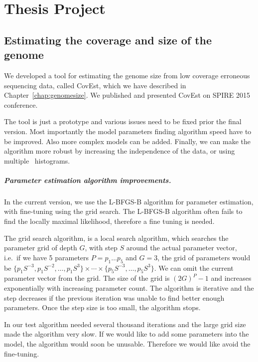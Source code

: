 \chapter{Thesis Project}


\section{Estimating the coverage and size of the genome}

We developed a tool for estimating the genome size from low coverage erroneous sequencing data, called CovEst, which we have described in Chapter~\ref{chap:genomesize}. We published and presented CovEst on SPIRE 2015 conference\cite{covest}.

The tool is just a prototype and various issues need to be fixed prior the final version. Most importantly the model parameters finding algorithm speed have to be improved. Also more complex models can be added. Finally, we can make the algorithm more robust by increasing the independence of the data, or using multiple \kmer\ histograms.

\paragraph{Parameter estimation algorithm improvements.}
In the current version, we use the L-BFGS-B\cite{l-bfgs-b} algorithm for parameter estimation, with fine-tuning using the grid search.
The L-BFGS-B algorithm often fails to find the locally maximal likelihood, therefore a fine tuning is needed.

The grid search algorithm, is a local search algorithm, which searches the parameter grid of depth $G$, with step $S$ around the actual parameter vector, i.e.\ if we have 5 parameters $P = p_1\dots p_5$ and $G = 3$, the grid of parameters would be $\{p_1 S^{-3}, p_1 S^{-2}, \dots, p_1 S^3\} \times \cdots \times \{p_5 S^{-3}, \dots, p_5 S^3\}$. We can omit the current parameter vector from the grid. The size of the grid is ${(2G)}^P - 1$ and increases exponentially with increasing parameter count. The algorithm is iterative and the step decreases if the previous iteration was unable to find better enough parameters. Once the step size is too small, the algorithm stops.

In our test algorithm needed several thousand iterations and the large grid size made the algorithm very slow. If we would like to add some parameters into the model, the algorithm would soon be unusable. Therefore we would like avoid the fine-tuning.

